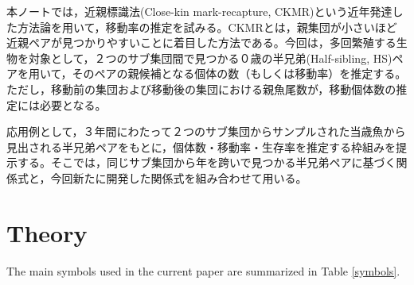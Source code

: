 \documentclass[AMA,STIX1COL]{WileyNJD-v2}
\begin{document}
本ノートでは，近親標識法(Close-kin mark-recapture, CKMR)という近年発達した方法論を用いて，移動率の推定を試みる。CKMRとは，親集団が小さいほど近親ペアが見つかりやすいことに着目した方法である。今回は，多回繁殖する生物を対象として，２つのサブ集団間で見つかる０歳の半兄弟(Half-sibling, HS)ペアを用いて，そのペアの親候補となる個体の数（もしくは移動率）を推定する。ただし，移動前の集団および移動後の集団における親魚尾数が，移動個体数の推定には必要となる。

応用例として，３年間にわたって２つのサブ集団からサンプルされた当歳魚から見出される半兄弟ペアをもとに，個体数・移動率・生存率を推定する枠組みを提示する。そこでは，同じサブ集団から年を跨いで見つかる半兄弟ペアに基づく関係式と，今回新たに開発した関係式を組み合わせて用いる。

\section{Theory}\label{sec2}
The main symbols used in the current paper are summarized in Table \ref{symbols}.
\end{document}
